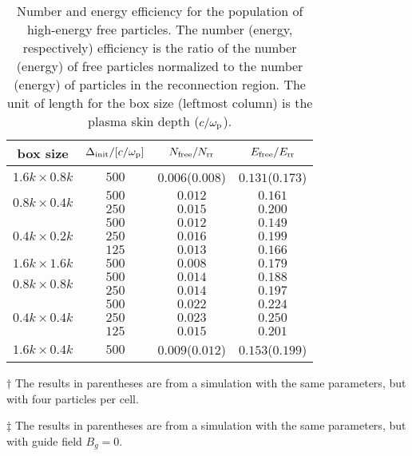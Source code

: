 \documentclass[twocolumn,twocolappendix]{aastex63}
\newcommand{\comp}{c/\omega_{\rm p}}
\begin{document}
\begin{table}[] 
\begin{threeparttable}
\begin{tabularx}{\columnwidth}{cccc}
\hline\hline
box size & $\Delta_{\rm init}/[\comp]$ & $N_{\rm free}/N_{\rm rr}$ & $E_{\rm free}/E_{\rm rr}$ \\ 
\hline
$1.6k\times0.8k$ & $500$ & $0.006$($0.008$)\tnote{$\dagger$} & $0.131$($0.173$) \\ 
\hline
\multirow{2}{*}{$0.8k\times0.4k$} & $500$ & $0.012$ & $0.161$ \\
& $250$ & $0.015$ & $0.200$ \\ 
\hline
\multirow{3}{*}{$0.4k\times0.2k$} & $500$ & $0.012$ & $0.149$ \\
& $250$ & $0.016$ & $0.199$ \\
& $125$ & $0.013$ & $0.166$ \\ 
\hline
$1.6k\times1.6k$ & $500$ & $0.008$ & $0.179$ \\ 
\hline
\multirow{2}{*}{$0.8k\times0.8k$} & $500$ & $0.014$ & $0.188$ \\
& $250$ & $0.014$ & $0.197$ \\ 
\hline
\multirow{3}{*}{$0.4k\times0.4k$} & $500$ & $0.022$ & $0.224$ \\
& $250$ & $0.023$ & $0.250$ \\
& $125$ & $0.015$ & $0.201$ \\
\hline
$1.6k\times0.4k$ & $500$ & $0.009$($0.012$)\tnote{$\ddagger$} & $0.153$($0.199$) \\
\hline
\end{tabularx}
\begin{tablenotes}\footnotesize
\item[$\dagger$] The results in  parentheses are from a simulation with the same parameters, but with four particles per cell.
\item[$\ddagger$] The results in  parentheses are from a simulation with the same parameters, but with guide field $B_g = 0$.
\end{tablenotes}
\caption{Number and energy efficiency for the population of high-energy free particles. The number (energy, respectively) efficiency is the ratio of the number (energy) of free particles normalized to the number (energy) of particles in the reconnection region. The unit of length for the box size (leftmost column) is the plasma skin depth ($\comp$). 
} \label{tab:box}
\end{threeparttable}
\end{table}
\end{document}
